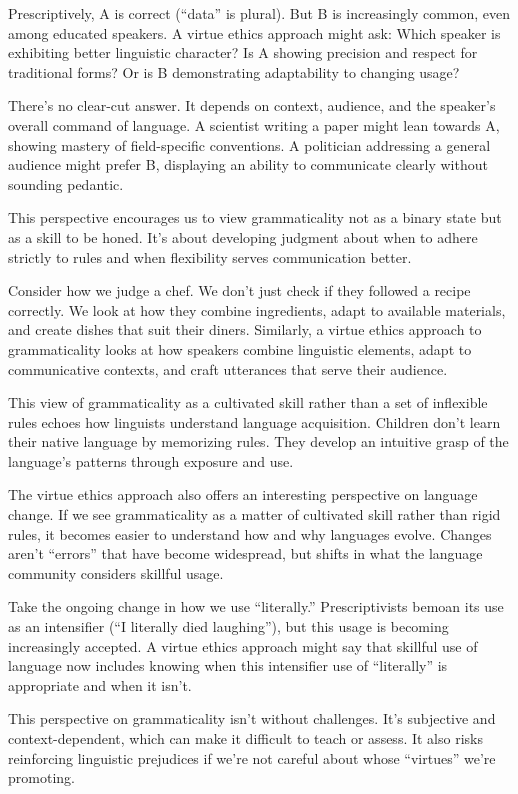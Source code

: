 Prescriptively, A is correct (``data'' is plural). But B is increasingly common, even among educated speakers. A virtue ethics approach might ask: Which speaker is exhibiting better linguistic character? Is A showing precision and respect for traditional forms? Or is B demonstrating adaptability to changing usage?

There's no clear-cut answer. It depends on context, audience, and the speaker's overall command of language. A scientist writing a paper might lean towards A, showing mastery of field-specific conventions. A politician addressing a general audience might prefer B, displaying an ability to communicate clearly without sounding pedantic.

This perspective encourages us to view grammaticality not as a binary state but as a skill to be honed. It's about developing judgment about when to adhere strictly to rules and when flexibility serves communication better.

Consider how we judge a chef. We don't just check if they followed a recipe correctly. We look at how they combine ingredients, adapt to available materials, and create dishes that suit their diners. Similarly, a virtue ethics approach to grammaticality looks at how speakers combine linguistic elements, adapt to communicative contexts, and craft utterances that serve their audience.

This view of grammaticality as a cultivated skill rather than a set of inflexible rules echoes how linguists understand language acquisition. Children don't learn their native language by memorizing rules. They develop an intuitive grasp of the language's patterns through exposure and use.

The virtue ethics approach also offers an interesting perspective on language change. If we see grammaticality as a matter of cultivated skill rather than rigid rules, it becomes easier to understand how and why languages evolve. Changes aren't ``errors'' that have become widespread, but shifts in what the language community considers skillful usage.

Take the ongoing change in how we use ``literally.'' Prescriptivists bemoan its use as an intensifier (``I literally died laughing''), but this usage is becoming increasingly accepted. A virtue ethics approach might say that skillful use of language now includes knowing when this intensifier use of ``literally'' is appropriate and when it isn't.

This perspective on grammaticality isn't without challenges. It's subjective and context-dependent, which can make it difficult to teach or assess. It also risks reinforcing linguistic prejudices if we're not careful about whose ``virtues'' we're promoting.

